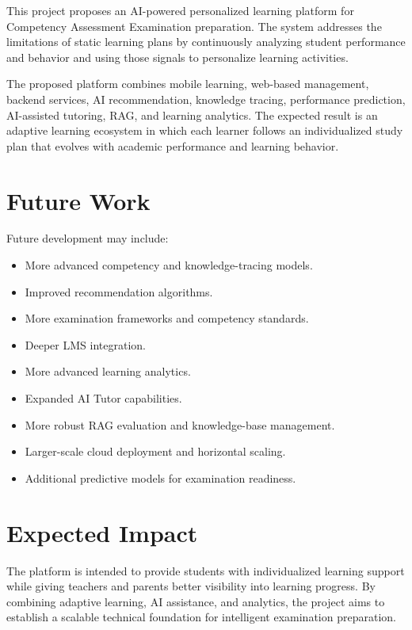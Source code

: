 \documentclass[12pt,a4paper]{report}
\begin{document}
This project proposes an AI-powered personalized learning platform for Competency Assessment Examination preparation. The system addresses the limitations of static learning plans by continuously analyzing student performance and behavior and using those signals to personalize learning activities.

The proposed platform combines mobile learning, web-based management, backend services, AI recommendation, knowledge tracing, performance prediction, AI-assisted tutoring, RAG, and learning analytics. The expected result is an adaptive learning ecosystem in which each learner follows an individualized study plan that evolves with academic performance and learning behavior.

\section{Future Work}

Future development may include:

\begin{itemize}
    \item More advanced competency and knowledge-tracing models.
    \item Improved recommendation algorithms.
    \item More examination frameworks and competency standards.
    \item Deeper LMS integration.
    \item More advanced learning analytics.
    \item Expanded AI Tutor capabilities.
    \item More robust RAG evaluation and knowledge-base management.
    \item Larger-scale cloud deployment and horizontal scaling.
    \item Additional predictive models for examination readiness.
\end{itemize}

\section{Expected Impact}

The platform is intended to provide students with individualized learning support while giving teachers and parents better visibility into learning progress. By combining adaptive learning, AI assistance, and analytics, the project aims to establish a scalable technical foundation for intelligent examination preparation.
\end{document}
